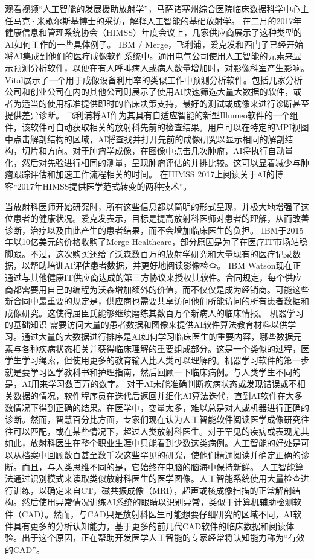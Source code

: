 观看视频“人工智能的发展援助放射学”，马萨诸塞州综合医院临床数据科学中心主任马克·米歇尔斯基博士的采访，解释人工智能的基础放射学。
在二月的2017年健康信息和管理系统协会（HIMSS）年度会议上，几家供应商展示了这种类型的AI如何工作的一些具体例子。 IBM / Merge，飞利浦，爱克发和西门子已经开始将AI集成到他们的医疗成像软件系统中。通用电气公司使用人工智能的元素来显示预测分析软件，以便在有人呼叫病人或病人数量增加时，对影像科室产生影响。 Vital展示了一个用于成像设备利用率的类似工作中预测分析软件。包括几家分析公司和创业公司在内的其他公司则展示了使用AI快速筛选大量大数据的软件，或者为适当的使用标准提供即时的临床决策支持，最好的测试或成像来进行诊断甚至提供差异诊断。
飞利浦将AI作为其具有自适应智能的新型Illumeo软件的一个组件，该软件可自动获取相关的放射科先前的检查结果。用户可以在特定的MPI视图中点击解剖结构的区域，AI将查找并打开先前的成像研究以显示相同的解剖结构，切片和方向。对于肿瘤学成像，在图像中点击几次肿瘤，AI将执行自动量化，然后对先验进行相同的测量，呈现肿瘤评估的并排比较。这可以显着减少与肿瘤跟踪评估和加速工作流程相关的时间。
在HIMSS 2017上阅读关于AI的博客“2017年HIMSS提供医学范式转变的两种技术”。
 

当放射科医师开始研究时，所有这些信息都以简明的形式呈现，并极大地增强了这位患者的健康状况。爱克发表示，目标是提高放射科医师对患者的理解，从而改善诊断，治疗以及由此产生的患者结果，而不会增加临床医生的负担。
IBM于2015年以10亿美元的价格收购了Merge Healthcare，部分原因是为了在医疗IT市场站稳脚跟。不过，这次购买还给了沃森数百万的放射学研究和大量现有的医疗记录数据，以帮助培训AI评估患者数据，并更好地阅读影像检查。 IBM Watson现在正通过与其他健康IT供应商达成的第三方协议来授权其软件。合同规定，每个供应商都需要用自己的编程为沃森增加额外的价值，而不仅仅是成为经销商。可能这些新合同中最重要的规定是，供应商也需要共享访问他们所能访问的所有患者数据和成像研究。这使得屈臣氏能够继续磨练其数百万个新病人的临床情报。
机器学习的基础知识
需要访问大量的患者数据和图像来提供AI软件算法教育材料以供学习。通过大量的大数据进行排序是AI如何学习临床医生的重要内容，哪些数据元素与各种疾病状态相关并获得临床理解的重要组成部分。这是一个类似的过程，医学生学习绳索，但使用更多的教育输入比人类可以理解的。机器学习软件的第一步就是要学习医学教科书和护理指南，然后回顾一下临床病例。与人类学生不同的是，AI用来学习数百万的数字。
对于AI未能准确判断疾病状态或发现错误或不相关数据的情况，软件程序员在迭代后返回并细化AI算法迭代，直到AI软件在大多数情况下得到正确的结果。在医学中，变量太多，难以总是对人或机器进行正确的诊断。然而，智慧百分比方面，专家们现在认为人工智能软件阅读医学成像研究往往可以匹配，或在某些情况下，超过人类放射科医生。对于罕见的疾病或表现尤其如此，放射科医生在整个职业生涯中只能看到少数这类病例。人工智能的好处是可以从档案中回顾数百甚至数千次这些罕见的研究，使他们精通阅读并确定正确的诊断。而且，与人类思维不同的是，它始终在电脑的脑海中保持新鲜。
人工智能算法通过识别模式来读取类似放射科医生的医学图像。人工智能系统使用大量检查进行训练，以确定来自CT，磁共振成像（MRI），超声或核成像扫描的正常解剖结构。然后使用异常情况训练AI系统的眼睛以识别异常，类似于计算机辅助检测软件（CAD）。然而，与CAD只是放射科医生可能想要仔细研究的区域不同，AI软件具有更多的分析认知能力，基于更多的前几代CAD软件的临床数据和阅读体验。出于这个原因，正在帮助开发医学人工智能的专家经常将认知能力称为“有效的CAD”。
   
